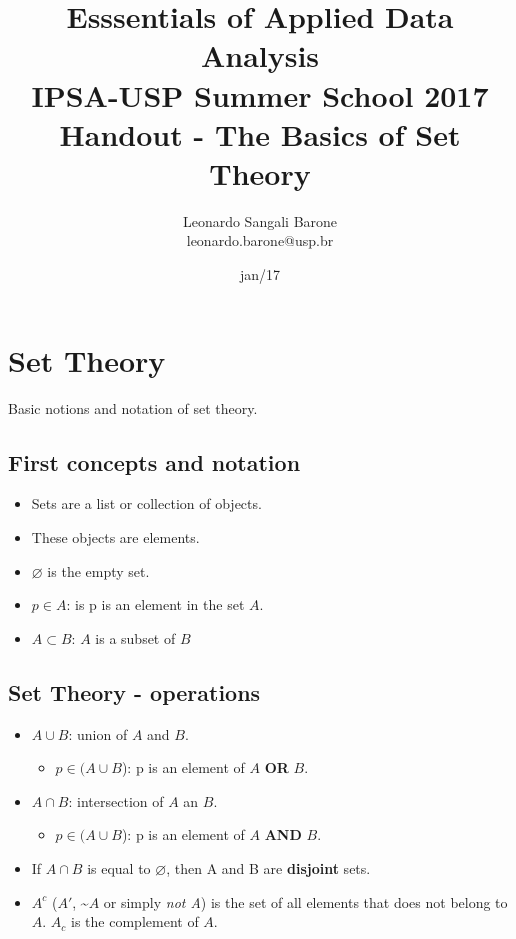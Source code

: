 \documentclass[11pt]{article}
\title{\textbf{Esssentials of Applied Data Analysis\\
				IPSA-USP Summer School 2017}\newline\\
				Handout - The Basics of Set Theory}
\author{Leonardo Sangali Barone\\leonardo.barone@usp.br}
\date{jan/17}
\let\emptyset\varnothing
\begin{document}
\maketitle

\section*{Set Theory}

Basic notions and notation of set theory.

\subsection*{First concepts and notation}

	\begin{itemize}
		\item Sets are a list or collection of objects.
		\item These objects are elements.
		\item $\emptyset$ is the empty set.
		\item $p \in A$: is p is an element in the set $A$.
		\item $A \subset B$: $A$ is a subset of $B$ 
	\end{itemize}


\subsection*{Set Theory - operations}

	\begin{itemize}
		\item $A \cup B$: union of $A$ and $B$.
		\begin{itemize}
			\item $p \in (A \cup B$): p is an element of $A$ \textbf{OR} $B$.
		\end{itemize}
		\item $A \cap B$: intersection of $A$ an $B$.
		\begin{itemize}
			\item $p \in (A \cup B$): p is an element of $A$ \textbf{AND} $B$.
		\end{itemize}
		\item If $A \cap B$ is equal to $\emptyset$, then A and B are \textbf{disjoint} sets.
		\item $A^c$ ($A'$, \textasciitilde$A$ or simply \emph{not A}) is the set of all elements that does not belong to $A$. $A_c$ is the complement of $A$. 

	\end{itemize}
\end{document}
